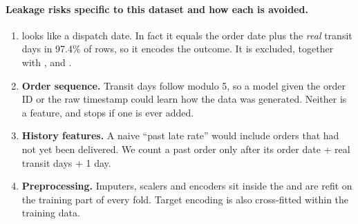 \paragraph{Leakage risks specific to this dataset and how each is avoided.}
\begin{enumerate}
  \item \textbf{} looks like a dispatch date. In fact it equals the
        order date plus the \emph{real} transit days in 97.4\% of rows, so it encodes the outcome.
        It is excluded, together with , 
        and .
  \item \textbf{Order sequence.} Transit days follow  modulo 5, so a model given
        the order ID or the raw timestamp could learn how the data was generated. Neither is a
        feature, and  stops if one is ever added.
  \item \textbf{History features.} A naive ``past late rate'' would include orders that had not
        yet been delivered. We count a past order only after its order date + real transit
        days + 1 day.
  \item \textbf{Preprocessing.} Imputers, scalers and encoders sit inside the  and
        are refit on the training part of every fold. Target encoding is also cross-fitted
        within the training data.
\end{enumerate}

